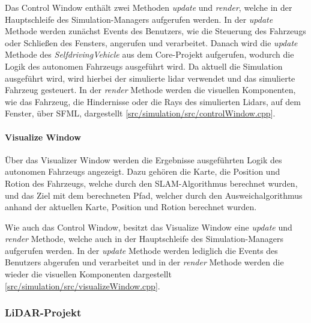 Das Control Window enthält zwei Methoden \textit{update} und \textit{render}, welche in der Hauptschleife des Simulation-Managers aufgerufen werden. In der \textit{update} Methode werden zunächst Events des Benutzers, wie die Steuerung des Fahrzeugs oder Schließen des Fensters, angerufen und verarbeitet. Danach wird die \textit{update} Methode des \textit{SelfdrivingVehicle} aus dem Core-Projekt aufgerufen, wodurch die Logik des autonomen Fahrzeugs ausgeführt wird. Da aktuell die Simulation ausgeführt wird, wird hierbei der simulierte \ac{lidar} verwendet und das simulierte Fahrzeug gesteuert. In der \textit{render} Methode werden die visuellen Komponenten, wie das Fahrzeug, die Hindernisse oder die Rays des simulierten Lidars, auf dem Fenster, über SFML, dargestellt [\href{https://github.com/Jundy0/Studienarbeit/blob/main/src/simulation/src/controlWindow.cpp}{src/simulation/src/controlWindow.cpp}]. 

\paragraph{Visualize Window} \mbox{}

Über das Visualizer Window werden die Ergebnisse ausgeführten Logik des autonomen Fahrzeugs angezeigt. Dazu gehören die Karte, die Position und Rotion des Fahrzeugs, welche durch den SLAM-Algorithmus berechnet wurden, und das Ziel mit dem berechneten Pfad, welcher durch den Ausweichalgorithmus anhand der aktuellen Karte, Position und Rotion berechnet wurden. 

Wie auch das Control Window, besitzt das Visualize Window eine \textit{update} und \textit{render} Methode, welche auch in der Hauptschleife des Simulation-Managers aufgerufen werden. In der \textit{update} Methode werden lediglich die Events des Benutzers abgerufen und verarbeitet und in der \textit{render} Methode werden die wieder die visuellen Komponenten dargestellt [\href{https://github.com/Jundy0/Studienarbeit/blob/main/src/simulation/src/visualizeWindow.cpp}{src/simulation/src/visualizeWindow.cpp}]. 

\subsubsection{LiDAR-Projekt}

